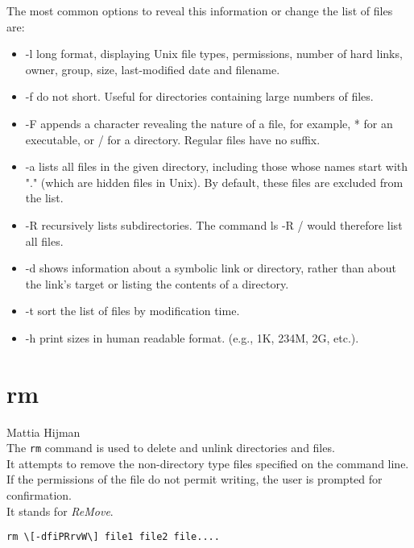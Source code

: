 \documentclass[hidelinks,12pt,a4paper,numbers=enddot]{scrartcl}
\begin{document}
The most common options to reveal this information or change the list of files are:
\begin{itemize}
    \item -l long format, displaying Unix file types, permissions, number of hard links,
        owner, group, size, last-modified date and filename.
    
    \item -f do not short. Useful for directories containing large numbers of files.
    \item -F appends a character revealing the nature of a file, for example, * for an executable,
        or / for a directory. Regular files have no suffix.
    
    \item -a lists all files in the given directory, including those whose names start with "."
        (which are hidden files in Unix). By default, these files are excluded from the list.
    
    \item -R recursively lists subdirectories. The command ls -R / would therefore list all files. 
    \item -d shows information about a symbolic link or directory, rather than about the link's
        target or listing the contents of a directory.
    
    \item -t sort the list of files by modification time.
    \item -h print sizes in human readable format. (e.g., 1K, 234M, 2G, etc.).
  
\end{itemize}

\section{rm}


\large Mattia Hijman \normalsize\\



The \texttt{rm} command is used to delete and unlink directories and files.\\
It attempts to remove the non-directory type files specified on the command line.
If the permissions of the file do not permit writing, the user is prompted for confirmation.\\
It stands for \emph{ReMove}.

\begin{verbatim}
rm \[-dfiPRrvW\] file1 file2 file....
\end{verbatim}
\end{document}
